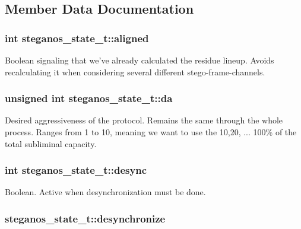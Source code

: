 \subsection{Member Data Documentation}
\hypertarget{structsteganos__state__t_a045c8296b2a0d027a5bfe22b187340b2}{
\subsubsection[{aligned}]{\setlength{\rightskip}{0pt plus 5cm}int {\bf steganos\_\-state\_\-t::aligned}}}
\label{structsteganos__state__t_a045c8296b2a0d027a5bfe22b187340b2}
Boolean signaling that we've already calculated the residue lineup. Avoids recalculating it when considering several different stego-\/frame-\/channels. \hypertarget{structsteganos__state__t_a3838589e5ef92d6293c6e7a7f40ba491}{
\subsubsection[{da}]{\setlength{\rightskip}{0pt plus 5cm}unsigned int {\bf steganos\_\-state\_\-t::da}}}
\label{structsteganos__state__t_a3838589e5ef92d6293c6e7a7f40ba491}
Desired aggressiveness of the protocol. Remains the same through the whole process. Ranges from 1 to 10, meaning we want to use the 10,20, ... 100\% of the total subliminal capacity. \hypertarget{structsteganos__state__t_ac771d3a52f60267c41251f183578a873}{
\subsubsection[{desync}]{\setlength{\rightskip}{0pt plus 5cm}int {\bf steganos\_\-state\_\-t::desync}}}
\label{structsteganos__state__t_ac771d3a52f60267c41251f183578a873}
Boolean. Active when desynchronization must be done. \hypertarget{structsteganos__state__t_a038d9b8c4d75e1e2cf047b0d89e7a07a}{
\subsubsection[{desynchronize}]{ {\bf steganos\_\-state\_\-t::desynchronize}}}
